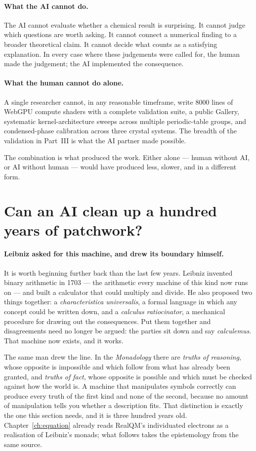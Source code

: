 \paragraph{What the AI cannot do.}
The AI cannot evaluate whether a chemical result is surprising. It cannot judge which questions are worth asking. It cannot connect a numerical finding to a broader theoretical claim. It cannot decide what counts as a satisfying explanation. In every case where these judgements were called for, the human made the judgement; the AI implemented the consequence.

\paragraph{What the human cannot do alone.}
A single researcher cannot, in any reasonable timeframe, write 8000 lines of WebGPU compute shaders with a complete validation suite, a public Gallery, systematic kernel-architecture sweeps across multiple periodic-table groups, and condensed-phase calibration across three crystal systems. The breadth of the validation in Part~III is what the AI partner made possible.

The combination is what produced the work. Either alone --- human without AI, or AI without human --- would have produced less, slower, and in a different form.

\section{Can an AI clean up a hundred years of patchwork?}\label{sec:ai-patchwork}

\paragraph{Leibniz asked for this machine, and drew its boundary himself.}
It is worth beginning further back than the last few years. Leibniz invented binary arithmetic in
1703 --- the arithmetic every machine of this kind now runs on --- and built a calculator that could
multiply and divide. He also proposed two things together: a \emph{characteristica universalis}, a
formal language in which any concept could be written down, and a \emph{calculus ratiocinator}, a
mechanical procedure for drawing out the consequences. Put them together and disagreements need no
longer be argued: the parties sit down and say \emph{calculemus}. That machine now exists, and it
works.

The same man drew the line. In the \emph{Monadology} there are \emph{truths of reasoning}, whose
opposite is impossible and which follow from what has already been granted, and \emph{truths of
fact}, whose opposite is possible and which must be checked against how the world is. A machine that
manipulates symbols correctly can produce every truth of the first kind and none of the second,
because no amount of manipulation tells you whether a description fits. That distinction is exactly
the one this section needs, and it is three hundred years old. Chapter~\ref{ch:equation} already
reads RealQM's individuated electrons as a realisation of Leibniz's monads; what follows takes the
epistemology from the same source.

